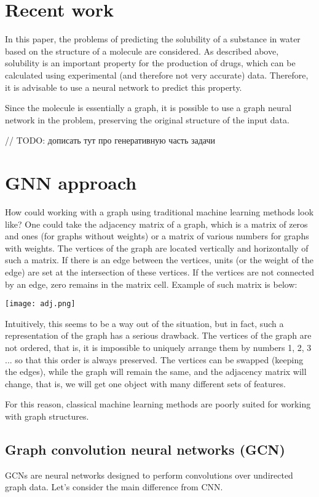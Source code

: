 \documentclass[a4paper,14pt]{article}
\begin{document}
\section{Recent work}
In this paper, the problems of predicting the solubility of a substance in water based on the structure of a molecule are considered. As described above, solubility is an important property for the production of drugs, which can be calculated using experimental (and therefore not very accurate) data. Therefore, it is advisable to use a neural network to predict this property.

Since the molecule is essentially a graph, it is possible to use a graph neural network in the problem, preserving the original structure of the input data.

// TODO: дописать тут про генеративную часть задачи

\section{GNN approach}

How could working with a graph using traditional machine learning methods look like? One could take the adjacency matrix of a graph, which is a matrix of zeros and ones (for graphs without weights) or a matrix of various numbers for graphs with weights. The vertices of the graph are located vertically and horizontally of such a matrix. If there is an edge between the vertices, units (or the weight of the edge) are set at the intersection of these vertices. If the vertices are not connected by an edge, zero remains in the matrix cell.
Example of such matrix is below:

\texttt{[image: adj.png]}

Intuitively, this seems to be a way out of the situation, but in fact, such a representation of the graph has a serious drawback. The vertices of the graph are not ordered, that is, it is impossible to uniquely arrange them by numbers 1, 2, 3 ... so that this order is always preserved. The vertices can be swapped (keeping the edges), while the graph will remain the same, and the adjacency matrix will change, that is, we will get one object with many different sets of features.

For this reason, classical machine learning methods are poorly suited for working with graph structures.

\subsection{Graph convolution neural networks (GCN)}
GCNs are neural networks designed to perform convolutions over undirected graph data. Let's consider the main difference from CNN.
\end{document}
